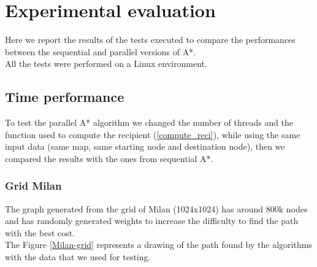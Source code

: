 \section{Experimental evaluation}
\label{Sec:experimental-eval}

Here we report the results of the tests executed to compare the performances between the sequential and parallel versions of A*.
\\
All the tests were performed on a Linux environment.

\subsection{Time performance}

To test the parallel A* algorithm we changed the number of threads and the function used to compute the recipient (\ref{compute_reci}), while using the same input data (same map, same starting node and destination node),
then we compared the results with the ones from sequential A*. 

\subsubsection{Grid Milan}
The graph generated from the grid of Milan (1024x1024) has around 800k nodes and has randomly generated weights to increase the difficulty to find the path with the best cost.
\\
The Figure \ref{Milan-grid} represents a drawing of the path found by the algorithms with the data that we used for testing.

